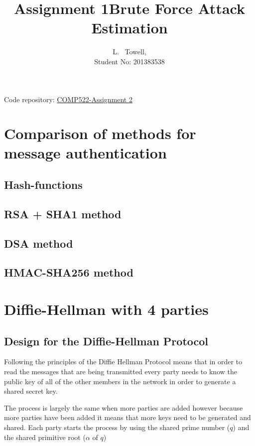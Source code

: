 \documentclass[a4paper, twoside, 11pt]{article}
\author{L. ~Towell,\\ Student No: 201383538}
\title{Assignment 1\break Brute Force Attack Estimation}
\begin{document}
	\maketitle

\maketitle
\begin{center}
Code repository: \href{https://github.com/luketowell/COMP522-Assignment2}{COMP522-Assignment 2}
\end{center}

\section{Comparison of methods for message authentication}
\subsection{Hash-functions}
\subsubsection{}
\subsection{RSA + SHA1 method}
\subsection{DSA method}
\subsection{HMAC-SHA256 method}


\section{Diffie-Hellman with 4 parties}
\subsection{Design for the Diffie-Hellman Protocol}
Following the principles of the Diffie Hellman Protocol means that in order
to read the messages that are being transmitted every party needs to know the
public key of all of the other members in the network in order to generate a shared secret key.

The process is largely the same when more parties are added however because more parties have been added it means that more keys need to be generated and shared. Each party starts the process by using the shared prime number ($q$) and the shared primitive root ($\alpha$ of $q$)
\end{document}
